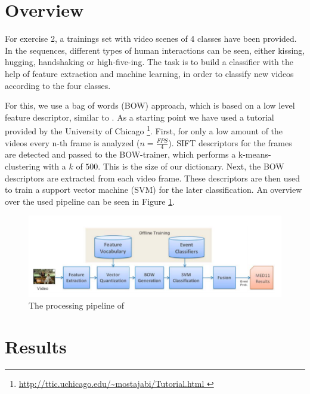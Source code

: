\documentclass[]{scrartcl}
\begin{document}
\maketitle

\section{Overview}
For exercise 2, a trainings set with video scenes of 4 classes have been provided. 
In the sequences, different types of human interactions can be seen, either kissing, hugging, handshaking or high-five-ing. 
The task is to build a classifier with the help of feature extraction and machine learning, in order to classify new videos according to the four classes.

For this, we use a bag of words (BOW) \cite{csurka2004visual} approach, which is based on a low level feature descriptor, similar to \cite{tamrakar2012evaluation}. As a starting point we have used a tutorial provided by the University of Chicago \footnote{\url{http://ttic.uchicago.edu/~mostajabi/Tutorial.html }}.
First, for only a low amount of the videos every n-th frame is analyzed ($n = \frac{FPS}{4}$). 
SIFT \cite{lowe2004distinctive} descriptors for the frames are detected and passed to the BOW-trainer, which performs a k-means-clustering with a $k$ of $500$. This is the size of our dictionary.
Next, the BOW descriptors are extracted from each video frame. 
These descriptors are then used to train a support vector machine (SVM) for the later classification.
An overview over the used pipeline can be seen in Figure \ref{fig:grafik}.
\begin{figure}[h]
	\centering
	\includegraphics[width = \textwidth]{papergrafik.png}
	\caption{The processing pipeline of \cite{tamrakar2012evaluation}}
	\label{fig:grafik}
\end{figure}

\section{Results}
\end{document}
